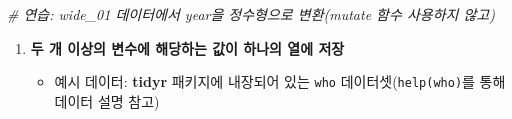 \documentclass[
  11pt,
]{krantz}
\newenvironment{Shaded}{\begin{snugshade}}{\end{snugshade}}
\newcommand{\CommentTok}[1]{\textcolor[rgb]{0.37,0.37,0.37}{\textit{#1}}}
\providecommand{\tightlist}{%
  \setlength{\itemsep}{0pt}\setlength{\parskip}{0pt}}
\begin{document}
\begin{Shaded}
\begin{Highlighting}[]
\CommentTok{# 연습: wide_01 데이터에서 year을 정수형으로 변환(mutate 함수 사용하지 않고)}
\end{Highlighting}
\end{Shaded}

\normalsize

\begin{enumerate}
\def\labelenumi{\arabic{enumi}.}
\setcounter{enumi}{1}
\tightlist
\item
  \textbf{두 개 이상의 변수에 해당하는 값이 하나의 열에 저장}

  \begin{itemize}
  \tightlist
  \item
    예시 데이터: \textbf{tidyr} 패키지에 내장되어 있는 \texttt{who} 데이터셋(\texttt{help(who)}를 통해 데이터 설명 참고)
  \end{itemize}
\end{enumerate}

\footnotesize
\end{document}
